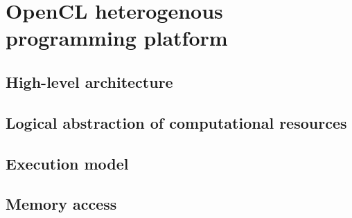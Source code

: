 \chapter{OpenCL heterogenous programming platform}
\section{High-level architecture}
\section{Logical abstraction of computational resources}
\section{Execution model}
\section{Memory access}

